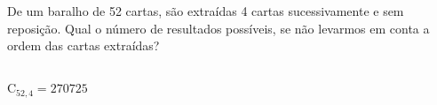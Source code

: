 \begin{ex}
 De um baralho de 52 cartas, são extraídas 4 cartas sucessivamente  e sem reposição. Qual o número de resultados possíveis, se não levarmos em conta a ordem das cartas extraídas?
   \begin{sol}
    \phantom{A} \\
    $\mathrm{C}_{{52},4}=270725$
   \end{sol}
\end{ex}